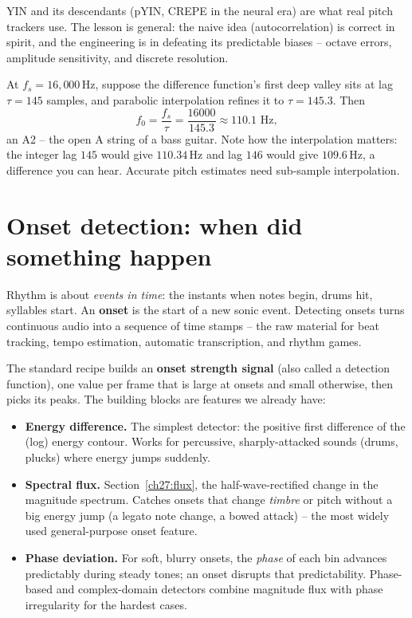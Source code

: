 YIN and its descendants (pYIN, CREPE in the neural era) are what real pitch
trackers use. The lesson is general: the naive idea (autocorrelation) is correct
in spirit, and the engineering is in defeating its predictable biases -- octave
errors, amplitude sensitivity, and discrete resolution.

\begin{example}
\label{ch27:ex-lag}
At $f_s = 16{,}000$\,Hz, suppose the difference function's first deep valley sits
at lag $\tau = 145$ samples, and parabolic interpolation refines it to
$\tau = 145.3$. Then
\[
f_0 = \frac{f_s}{\tau} = \frac{16000}{145.3} \approx 110.1\text{ Hz},
\]
an A2 -- the open A string of a bass guitar. Note how the interpolation matters:
the integer lag $145$ would give $110.34$\,Hz and lag $146$ would give
$109.6$\,Hz, a difference you can hear. Accurate pitch estimates need sub-sample
interpolation.
\end{example}

\section{Onset detection: when did something happen}
\label{ch27:onset}

Rhythm is about \emph{events in time}: the instants when notes begin, drums hit,
syllables start. An \textbf{onset} is the start of a new sonic event. Detecting
onsets turns continuous audio into a sequence of time stamps -- the raw material
for beat tracking, tempo estimation, automatic transcription, and rhythm games.

The standard recipe builds an \textbf{onset strength signal} (also called a
detection function), one value per frame that is large at onsets and small
otherwise, then picks its peaks. The building blocks are features we already have:

\begin{itemize}
  \item \textbf{Energy difference.} The simplest detector: the positive
        first difference of the (log) energy contour. Works for percussive,
        sharply-attacked sounds (drums, plucks) where energy jumps suddenly.
  \item \textbf{Spectral flux.} Section~\ref{ch27:flux}, the half-wave-rectified
        change in the magnitude spectrum. Catches onsets that change \emph{timbre}
        or pitch without a big energy jump (a legato note change, a bowed
        attack) -- the most widely used general-purpose onset feature.
  \item \textbf{Phase deviation.} For soft, blurry onsets, the \emph{phase} of
        each bin advances predictably during steady tones; an onset disrupts that
        predictability. Phase-based and complex-domain detectors combine magnitude
        flux with phase irregularity for the hardest cases.
\end{itemize}

